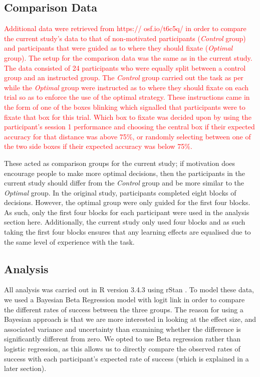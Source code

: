 \documentclass[vision,article,submit,moreauthors,pdftex,10pt,a4paper]{mdpi}
\begin{document}
\subsection{Comparison Data}
\textcolor{red}{Additional data were retrieved from https:// osf.io/t6c5q/ in order to compare the current study’s data to that of non-motivated participants (\textit{Control} group) and participants that were guided as to where they should fixate (\textit{Optimal} group). The setup for the comparison data was the same as in the current study. The data consisted of 24 participants who were equally split between a control group and an instructed group. The \textit{Control} group carried out the task as per \cite{clarke2015failure} while the \textit{Optimal} group were instructed as to where they should fixate on each trial so as to enforce the use of the optimal strategy. These instructions came in the form of one of the boxes blinking which signalled that participants were to fixate that box for this trial. Which box to fixate was decided upon by using the participant's session 1 performance and choosing the central box if their expected accuracy for that distance was above 75\%, or randomly selecting between one of the two side boxes if their expected accuracy was below 75\%.} 

These acted as comparison groups for the current study; if motivation does encourage people to make more optimal decisions, then the participants in the current study should differ from the \textit{Control} group and be more similar to the \textit{Optimal} group. In the original study, participants completed eight blocks of decisions. However, the optimal group were only guided for the first four blocks. As such, only the first four blocks for each participant were used in the analysis section here. Additionally, the current study only used four blocks and as such taking the first four blocks ensures that any learning effects are equalised due to the same level of experience with the task. %

\subsection{Analysis}
All analysis was carried out in R version 3.4.3 \cite{R} using rStan \cite{Rstan}. To model these data, we used a Bayesian Beta Regression model \cite{ferrari2004beta} with logit link in order to compare the different rates of success between the three groups. The reason for using a Bayesian approach is that we are more interested in looking at the effect size, and associated variance and uncertainty than examining whether the difference is significantly different from zero. We opted to use Beta regression rather than logistic regression, as this allows us to directly compare the observed rates of success with each participant’s expected rate of success (which is explained in a later section). 
\end{document}

